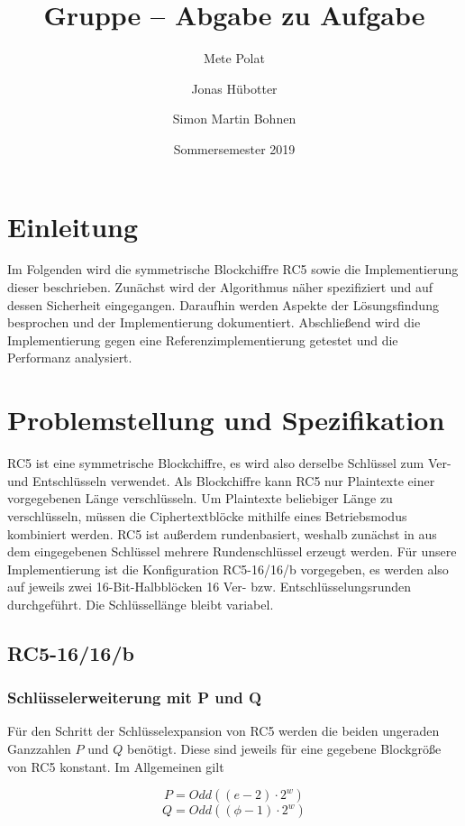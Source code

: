 \documentclass[course=erap]{aspdoc}
\author{Mete Polat \and Jonas Hübotter \and Simon Martin Bohnen}
\date{Sommersemester 2019} %
\title{Gruppe \theGroup{} -- Abgabe zu Aufgabe \theNumber}
\begin{document}
\maketitle

\section{Einleitung}

Im Folgenden wird die symmetrische Blockchiffre RC5 sowie die Implementierung dieser beschrieben. Zunächst wird der Algorithmus näher spezifiziert und auf dessen Sicherheit eingegangen. Daraufhin werden Aspekte der Lösungsfindung besprochen und der Implementierung dokumentiert. Abschließend wird die Implementierung gegen eine Referenzimplementierung getestet und die Performanz analysiert.

\section{Problemstellung und Spezifikation}

RC5 ist eine symmetrische Blockchiffre, es wird also derselbe Schlüssel zum Ver- und Entschlüsseln verwendet. Als Blockchiffre kann RC5 nur Plaintexte einer vorgegebenen Länge verschlüsseln. Um Plaintexte beliebiger Länge zu verschlüsseln, müssen die Ciphertextblöcke mithilfe eines Betriebsmodus kombiniert werden.
RC5 ist außerdem rundenbasiert, weshalb zunächst in aus dem eingegebenen Schlüssel mehrere Rundenschlüssel erzeugt werden. Für unsere Implementierung ist die Konfiguration RC5-16/16/b vorgegeben, es werden also auf jeweils zwei 16-Bit-Halbblöcken 16 Ver- bzw. Entschlüsselungsrunden durchgeführt. Die Schlüssellänge bleibt variabel.

\subsection{RC5-16/16/b}

\subsubsection{Schlüsselerweiterung mit P und Q}

Für den Schritt der Schlüsselexpansion von RC5 werden die beiden ungeraden Ganzzahlen $P$ und $Q$ benötigt. Diese sind jeweils für eine gegebene Blockgröße von RC5 konstant. Im Allgemeinen gilt

\begin{equation}
    P = Odd((e - 2) \cdot 2^w)
\end{equation}
\begin{equation}
    Q = Odd((\phi - 1) \cdot 2^w)
\end{equation}
\end{document}
